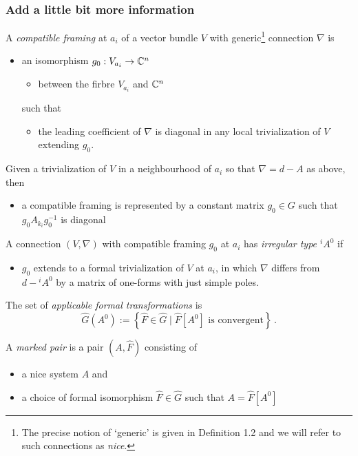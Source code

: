 \subsubsection{Add a little bit more information}
\begin{defn}
  A \emph{compatible framing} at $a_i$ of a vector bundle $V$ with
  generic\footnote{The precise notion of ‘generic’ is given in
    \cite{thboalch} Definition 1.2 and we will refer to such connections as
    \emph{nice}.} connection $\nabla$ is
  \begin{itemize}
    \item an isomorphism $g_0:V_{a_i}\to\mathbb{C}^n$
      \begin{itemize}
        \item between the firbre $V_{a_i}$ and $\mathbb{C}^n$
      \end{itemize}
      such that
      \begin{itemize}
        \item the leading coefficient of $\nabla$ is diagonal in any local
          trivialization of $V$ extending $g_0$.
      \end{itemize}
  \end{itemize}
  \begin{rem}
    Given a trivialization of $V$ in a neighbourhood of $a_i$ so that
    $\nabla=d-A$ as above, then
    \begin{itemize}
      \item a compatible framing is represented by a constant matrix
        $g_0\in G$ such that $g_0A_{k_i}g_0^{-1}$ is diagonal
    \end{itemize}
  \end{rem}
\end{defn}
\begin{paracol}{2}\sloppy
\switchcolumn[0]\noindent
  \begin{defn}[2.4]
    A connection $(V,\nabla)$ with compatible framing $g_0$ at $a_i$ has
    \emph{irregular type ${}^iA^0$} if
    \begin{itemize}
      \item $g_0$ extends to a formal trivialization of $V$ at $a_i$, in which
        $\nabla$ differs from $d-{}^iA^0$ by a matrix of one-forms with just
        simple poles.
    \end{itemize}
  \end{defn}
\switchcolumn[1]\noindent
  \begin{defn}
    The set of \emph{applicable formal transformations} is
    \[
      \hat G(A^0):=\left\{\hat F\in\hat G
        \mid\hat F[A^0] \text{ is convergent}\right\}\,.
    \]
  \end{defn}

  \begin{defn}
    A \emph{marked pair} is a pair $(A, \hat F)$ consisting of
    \begin{itemize}
      \item a nice system $A$ and
      \item a choice of formal isomorphism $\hat F \in \hat G$ such that
        $A = \hat F[A^0]$
    \end{itemize}
  \end{defn}
\end{paracol}
